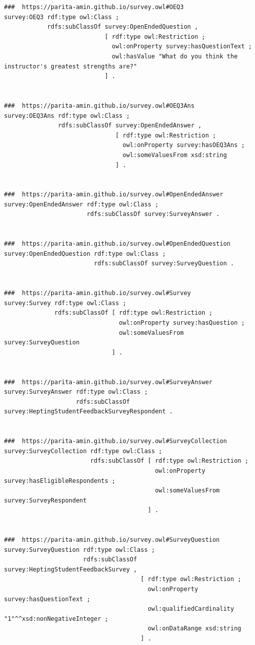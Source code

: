 \begin{lstlisting}
###  https://parita-amin.github.io/survey.owl#OEQ3
survey:OEQ3 rdf:type owl:Class ;
            rdfs:subClassOf survey:OpenEndedQuestion ,
                            [ rdf:type owl:Restriction ;
                              owl:onProperty survey:hasQuestionText ;
                              owl:hasValue "What do you think the instructor's greatest strengths are?"
                            ] .


###  https://parita-amin.github.io/survey.owl#OEQ3Ans
survey:OEQ3Ans rdf:type owl:Class ;
               rdfs:subClassOf survey:OpenEndedAnswer ,
                               [ rdf:type owl:Restriction ;
                                 owl:onProperty survey:hasOEQ3Ans ;
                                 owl:someValuesFrom xsd:string
                               ] .


###  https://parita-amin.github.io/survey.owl#OpenEndedAnswer
survey:OpenEndedAnswer rdf:type owl:Class ;
                       rdfs:subClassOf survey:SurveyAnswer .


###  https://parita-amin.github.io/survey.owl#OpenEndedQuestion
survey:OpenEndedQuestion rdf:type owl:Class ;
                         rdfs:subClassOf survey:SurveyQuestion .


###  https://parita-amin.github.io/survey.owl#Survey
survey:Survey rdf:type owl:Class ;
              rdfs:subClassOf [ rdf:type owl:Restriction ;
                                owl:onProperty survey:hasQuestion ;
                                owl:someValuesFrom survey:SurveyQuestion
                              ] .


###  https://parita-amin.github.io/survey.owl#SurveyAnswer
survey:SurveyAnswer rdf:type owl:Class ;
                    rdfs:subClassOf survey:HeptingStudentFeedbackSurveyRespondent .


###  https://parita-amin.github.io/survey.owl#SurveyCollection
survey:SurveyCollection rdf:type owl:Class ;
                        rdfs:subClassOf [ rdf:type owl:Restriction ;
                                          owl:onProperty survey:hasEligibleRespondents ;
                                          owl:someValuesFrom survey:SurveyRespondent
                                        ] .


###  https://parita-amin.github.io/survey.owl#SurveyQuestion
survey:SurveyQuestion rdf:type owl:Class ;
                      rdfs:subClassOf survey:HeptingStudentFeedbackSurvey ,
                                      [ rdf:type owl:Restriction ;
                                        owl:onProperty survey:hasQuestionText ;
                                        owl:qualifiedCardinality "1"^^xsd:nonNegativeInteger ;
                                        owl:onDataRange xsd:string
                                      ] .



\end{lstlisting}
